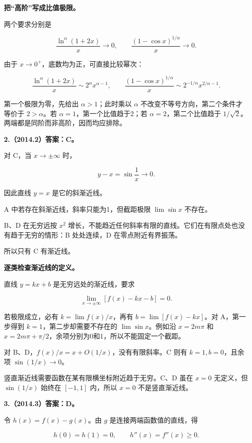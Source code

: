 \documentclass[UTF8,11pt,fontset=windows]{ctexart}
\begin{document}
\textbf{把“高阶”写成比值极限。}

两个要求分别是

$$
\frac{\ln^\alpha(1+2x)}x\to0,
\qquad
\frac{(1-\cos x)^{1/\alpha}}x\to0.
$$

由于 $x\to0^+$，底数均为正，可直接比较幂次：

$$
\frac{\ln^\alpha(1+2x)}x\sim2^\alpha x^{\alpha-1},
\qquad
\frac{(1-\cos x)^{1/\alpha}}x
\sim2^{-1/\alpha}x^{2/\alpha-1}.
$$

第一个极限为零，先给出 $\alpha>1$；此时乘以 $\alpha$ 不改变不等号方向，第二个条件才等价于 $2>\alpha$。若 $\alpha=1$，第一个比值趋于2；若 $\alpha=2$，第二个比值趋于 $1/\sqrt2$。两端都是同阶而非高阶，因而均应排除。

\clearpage

\textbf{2.（2014.2）答案：C。}

对 C，当 $x\to\pm\infty$ 时，

$$
y-x=\sin\frac1x\longrightarrow0.
$$

因此直线 $y=x$ 是它的斜渐近线。

A 中若存在斜渐近线，斜率只能为1，但截距极限 $\lim\sin x$ 不存在。

B、D 在无穷远按 $x^2$ 增长，不能趋近任何斜率有限的直线。它们在有限点处也没有趋于无穷的情形：B 处处连续，D 在零点附近有界振荡。

所以只有 C 有渐近线。

\textbf{逐类检查渐近线的定义。}

直线 $y=kx+b$ 是无穷远处的渐近线，要求

$$
\lim_{x\to\pm\infty}[f(x)-kx-b]=0.
$$

若极限成立，必有 $k=\lim f(x)/x$，再有 $b=\lim[f(x)-kx]$。对 A，第一步得到 $k=1$，第二步却需要不存在的 $\lim\sin x$。例如沿 $x=2m\pi$ 和 $x=2m\pi+\pi/2$，余项分别为0和1，所以不能固定一个截距。

对 B、D，$f(x)/x=x+O(1/x)$，没有有限斜率。C 则有 $k=1,b=0$，且余项 $\sin(1/x)\to0$。

竖直渐近线需要函数在某有限横坐标附近趋于无穷。C、D 虽在 $x=0$ 无定义，但 $\sin(1/x)$ 始终在 $[-1,1]$ 内，所以 $x=0$ 不是竖直渐近线。

\clearpage

\textbf{3.（2014.3）答案：D。}

令 $h(x)=f(x)-g(x)$。由 $g$ 是连接两端函数值的直线，得

$$
h(0)=h(1)=0,
\qquad h''(x)=f''(x)\ge0.
$$
\end{document}
